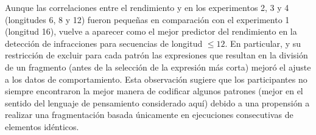 
Aunque las correlaciones entre el rendimiento y \mdlbin en los experimentos 2, 3 y 4 (longitudes 6, 8 y 12) fueron pequeñas en comparación con el experimento 1 (longitud 16), \mdlbin vuelve a aparecer como el mejor predictor del rendimiento en la detección de infracciones para secuencias de longitud $\leq 12$. En particular, \mdlbinfrag y su restricción de excluir para cada patrón las expresiones que resultan en la división de un fragmento (antes de la selección de la expresión más corta) mejoró el ajuste a los datos de comportamiento. Esta observación sugiere que los participantes no siempre encontraron la mejor manera de codificar algunos patrones (mejor en el sentido del lenguaje de pensamiento considerado aquí) debido a una propensión a realizar una fragmentación basada únicamente en ejecuciones consecutivas de elementos idénticos.



